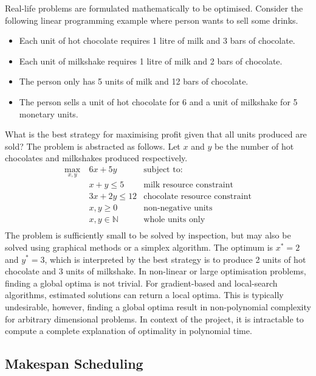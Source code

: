 Real-life problems are formulated mathematically to be optimised. Consider the following linear programming example where person wants to sell some drinks.
\begin{itemize}
	\item Each unit of hot chocolate requires 1 litre of milk and 3 bars of chocolate.
	\item Each unit of milkshake requires 1 litre of milk and 2 bars of chocolate.
	\item The person only has 5 units of milk and 12 bars of chocolate.
	\item The person sells a unit of hot chocolate for 6 and a unit of milkshake for 5 monetary units.
\end{itemize}
What is the best strategy for maximising profit given that all units produced are sold? The problem is abstracted as follows. Let $x$ and $y$ be the number of hot chocolates and milkshakes produced respectively.
\begin{align*}
	\max_{x,y}\ &6x+5y&\text{subject to:}\\
	&x+y\leq 5&\text{milk resource constraint}\\
	&3x+2y\leq 12&\text{chocolate resource constraint}\\
	&x,y\geq 0&\text{non-negative units}\\
	&x,y\in\mathbb{N}&\text{whole units only}\\
\end{align*}
The problem is sufficiently small to be solved by inspection, but may also be solved using graphical methods or a simplex algorithm. The optimum is $x^*=2$ and $y^*=3$, which is interpreted by the best strategy is to produce 2 units of hot chocolate and 3 units of milkshake.
\linespace
In non-linear or large optimisation problems, finding a global optima is not trivial. For gradient-based and local-search algorithms, estimated solutions can return a local optima. This is typically undesirable, however, finding a global optima result in non-polynomial complexity for arbitrary dimensional problems. In context of the project, it is intractable to compute a complete explanation of optimality in polynomial time.

\subsection{Makespan Scheduling}
\label{makespan}

